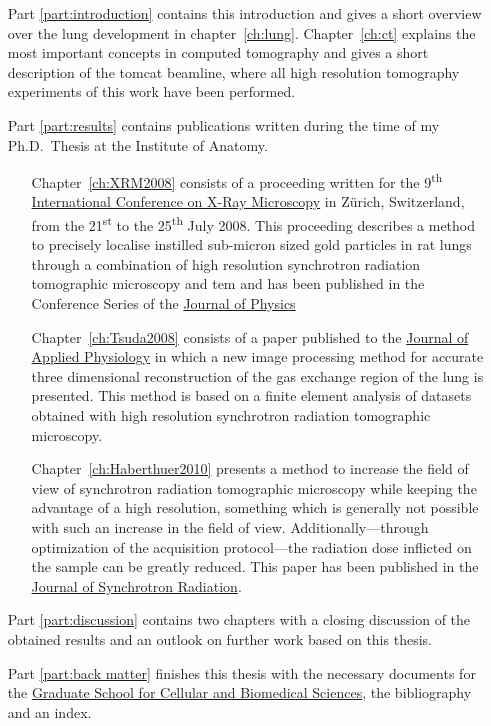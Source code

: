 \begin{itemize}
	\item [Part \ref{part:introduction}] contains this introduction and gives a short overview over the lung development in chapter~\ref{ch:lung}. Chapter~\ref{ch:ct} explains the most important concepts in computed tomography and gives a short description of the \acf{tomcat} beamline, where all high resolution tomography experiments of this work have been performed.
	\item [Part \ref{part:results}] contains publications written during the time of my Ph.D.\ Thesis at the Institute of Anatomy.
	\begin{itemize}
		\item [Chapter~\ref{ch:XRM2008}] consists of a proceeding written for the 9\textsuperscript{th} \href{http://xrm2008.web.psi.ch/}{International Conference on X-Ray Microscopy} in Zürich, Switzerland, from the 21\textsuperscript{st} to the 25\textsuperscript{th} July 2008. This proceeding describes a method to precisely localise instilled sub-micron sized gold particles in rat lungs through a combination of high resolution synchrotron radiation tomographic microscopy and \acl{tem} and has been published in the Conference Series of the \href{http://iopscience.iop.org/1742-6596/}{Journal of Physics}
		\item [Chapter~\ref{ch:Tsuda2008}] consists of a paper published to the \href{http://jap.physiology.org/}{Journal of Applied Physiology} in which a new image processing method for accurate three dimensional reconstruction of the gas exchange region of the lung is presented. This method is based on a finite element analysis of datasets obtained with high resolution synchrotron radiation tomographic microscopy.
		\item [Chapter~\ref{ch:Haberthuer2010}] presents a method to increase the field of view of synchrotron radiation tomographic microscopy while keeping the advantage of a high resolution, something which is generally not possible with such an increase in the field of view. Additionally---through optimization of the acquisition protocol---the radiation dose inflicted on the sample can be greatly reduced. This paper has been published in the \href{http://journals.iucr.org/s/}{Journal of Synchrotron Radiation}.
	\end{itemize}
	\item [Part \ref{part:discussion}] contains two chapters with a closing discussion of the obtained results and an outlook on further work based on this thesis.
	\item [Part \ref{part:back matter}] finishes this thesis with the necessary documents for the \href{http://www.gcb.unibe.ch}{Graduate School for Cellular and Biomedical Sciences}, the bibliography and an index.
\end{itemize}